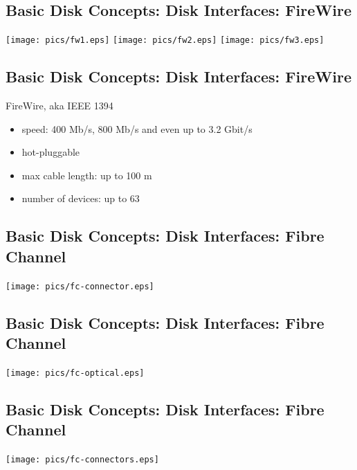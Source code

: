 \documentclass[xga]{xdvislides}
\begin{document}
\subsection{Basic Disk Concepts: Disk Interfaces: FireWire}
\vfill
	\begin{center}
		\texttt{[image: pics/fw1.eps]}
		\texttt{[image: pics/fw2.eps]}
		\texttt{[image: pics/fw3.eps]}
	\end{center}
\vfill

\subsection{Basic Disk Concepts: Disk Interfaces: FireWire}
FireWire, aka IEEE 1394
\begin{itemize}
	\item speed: 400 Mb/s, 800 Mb/s and even up to 3.2 Gbit/s
	\item hot-pluggable
	\item max cable length: up to 100 m
	\item number of devices: up to 63
\end{itemize}
\newpage






\subsection{Basic Disk Concepts: Disk Interfaces: Fibre Channel}
\vfill
	\begin{center}
		\texttt{[image: pics/fc-connector.eps]} \\
	\end{center}
\vfill

\subsection{Basic Disk Concepts: Disk Interfaces: Fibre Channel}
\vfill
	\begin{center}
		\texttt{[image: pics/fc-optical.eps]} \\
	\end{center}
\vfill

\subsection{Basic Disk Concepts: Disk Interfaces: Fibre Channel}
\vfill
	\begin{center}
		\texttt{[image: pics/fc-connectors.eps]} \\
	\end{center}
\vfill
\end{document}
